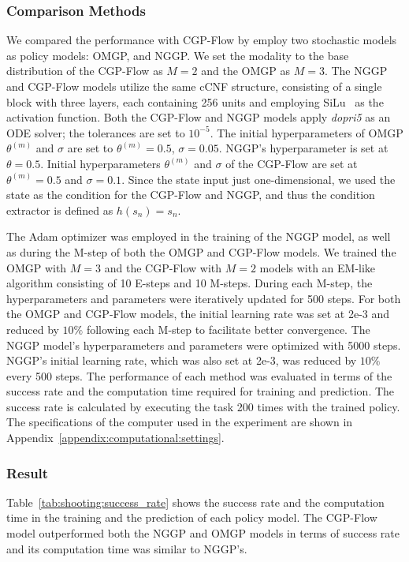 \documentclass[sn-mathphys-num]{sn-jnl}
\begin{document}
\subsubsection{Comparison Methods}
We compared the performance with CGP-Flow by employ two stochastic models as policy models: OMGP, and NGGP.
We set the modality to the base distribution of the CGP-Flow as $M=2$ and the OMGP as $M=3$.
The NGGP and CGP-Flow models utilize the same cCNF structure, consisting of a single block with three layers, each containing 256 units and employing SiLu~\cite{elfwing2018sigmoid} as the activation function.
Both the CGP-Flow and NGGP models apply \textit{dopri5} as an ODE solver; the tolerances are set to $10^{-5}$.
The initial hyperparameters of OMGP $\theta^{(m)}$ and $\sigma$ are set to $\theta^{(m)}=0.5$, $\sigma=0.05$.
NGGP's hyperparameter is set at $\theta=0.5$.
Initial hyperparameters $\theta^{(m)}$ and $\sigma$ of the CGP-Flow are set at $\theta^{(m)}=0.5$ and $\sigma=0.1$.
Since the state input just one-dimensional, we used the state as the condition for the CGP-Flow and NGGP, and thus the condition extractor is defined as $h(s_n)=s_n$.

The Adam optimizer was employed in the training of the NGGP model, as well as during the M-step of both the OMGP and CGP-Flow models.
We trained the OMGP with $M=3$ and the CGP-Flow with $M=2$ models with an EM-like algorithm consisting of 10 E-steps and 10 M-steps.
During each M-step, the hyperparameters and parameters were iteratively updated for 500 steps.
For both the OMGP and CGP-Flow models, the initial learning rate was set at 2e-3 and reduced by $10\%$ following each M-step to facilitate better convergence.
The NGGP model's hyperparameters and parameters were optimized with 5000 steps.
NGGP's initial learning rate, which was also set at 2e-3, was reduced by $10\%$ every 500 steps.
The performance of each method was evaluated in terms of the success rate and the computation time required for training and prediction.
The success rate is calculated by executing the task 200 times with the trained policy.
The specifications of the computer used in the experiment are shown in Appendix~\ref{appendix:computational:settings}.



\subsubsection{Result}
Table~\ref{tab:shooting:success_rate} shows the success rate and the computation time in the training and the prediction of each policy model.
The CGP-Flow model outperformed both the NGGP and OMGP models in terms of success rate and its computation time was similar to NGGP's.
\end{document}
